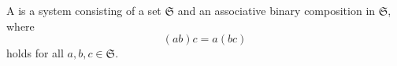 A  is a system consisting of a set $\mathfrak{S}$ and an associative binary composition in $\mathfrak{S}$, where
$$(ab)c = a(bc)$$
holds for all $a,b,c \in \mathfrak{S}$.
